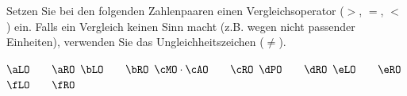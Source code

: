 Setzen Sie bei den folgenden Zahlenpaaren einen Vergleichsoperator ($>$, $=$, $<$) ein. Falls ein Vergleich keinen Sinn macht (z.B. wegen nicht passender Einheiten), verwenden Sie das Ungleichheitszeichen ($\neq$).

\begin{abcliste}
\abc $\aLO \qquad \aRO$
\abc $\bLO \qquad \bRO$
\abc $\cMO\cdot\cAO \qquad \cRO$
\abc $\dPO \qquad \dRO$
\abc $\eLO \qquad \eRO$
\abc $\fLO \qquad \fRO$
\end{abcliste}
